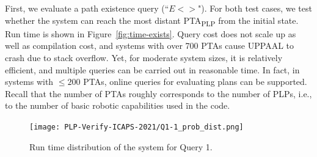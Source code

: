 \documentclass[letterpaper]{article}
\newcommand\rNote[1]{\todo[inline, author=Ronen, color=yellow]{#1}}
\newcommand\aNote[1]{\todo[inline, author=Alex, color=GreenYellow]{#1}}
\newcommand{\frameImage}[4]{
\begin{figure}[H]
  \centerline{
    \fcolorbox{frameColor}{white}{
        \texttt{[image: \#1]} } }
    \caption{#4}
    \label{fig:#1}
\end{figure}
}
\begin{document}





First, we evaluate a path existence query (``$E<>$").
For both test cases, we test whether the system can reach the most distant PTA\textsubscript{PLP} from the initial state.
%
Run time is
shown in Figure~\ref{fig:time-exists}. %
Query cost does not scale up as well as compilation cost,
and systems with over 700 PTAs cause UPPAAL to crash due to stack overflow. Yet,  for moderate system sizes, it is relatively efficient, and multiple queries can be carried out in reasonable time. In fact, in systems with $\leq  200$ PTAs, online queries for evaluating plans can be supported.
Recall that the number of PTAs roughly corresponds to the number of PLPs,
i.e., to the number of basic robotic capabilities used in the code.



\begin{figure}[htb!]
  \centering
  \texttt{[image: PLP-Verify-ICAPS-2021/Q1-1\_prob\_dist.png]}
  \caption{Run time distribution of the system for Query 1.}
  \label{fig:robotic-example-query1}
\end{figure}
\end{document}

